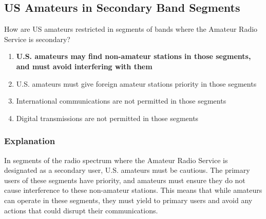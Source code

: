 \subsection{US Amateurs in Secondary Band Segments}
\label{T1B08}

\begin{tcolorbox}[colback=gray!10!white,colframe=black!75!black,title=T1B08]
How are US amateurs restricted in segments of bands where the Amateur Radio Service is secondary?
\begin{enumerate}[label=\Alph*),noitemsep]
    \item \textbf{U.S. amateurs may find non-amateur stations in those segments, and must avoid interfering with them}
    \item U.S. amateurs must give foreign amateur stations priority in those segments
    \item International communications are not permitted in those segments
    \item Digital transmissions are not permitted in those segments
\end{enumerate}
\end{tcolorbox}

\subsubsection*{Explanation}
In segments of the radio spectrum where the Amateur Radio Service is designated as a secondary user, U.S. amateurs must be cautious. The primary users of these segments have priority, and amateurs must ensure they do not cause interference to these non-amateur stations. This means that while amateurs can operate in these segments, they must yield to primary users and avoid any actions that could disrupt their communications.